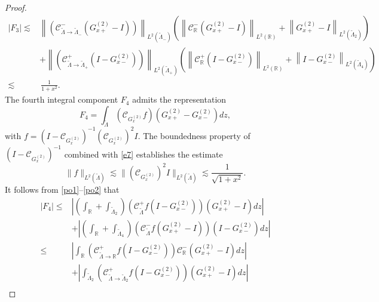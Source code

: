 \documentclass[preprint,compress,12pt]{elsarticle}
\numberwithin{equation}{section}
\begin{document}
\begin{proof}
\begin{align*}
\left|F_{3}\right|\lesssim&\left\|\left(\mathcal{C}_{\widetilde{\Lambda}\rightarrow\widetilde{\Lambda}_{-}}^{-}\left(G^{(2)}_{x+}-I\right)\right)\right\|_{L^{2}(\widetilde{\Lambda}_{-})}\left(\left\|\mathcal{C}_{\mathbb{R}}^{-}\left(G^{(2)}_{x+}-I\right)\right\|_{L^{2}(\mathbb{R})}+\left\|G^{(2)}_{x+}-I\right\|_{L^{2}(\widetilde{\Lambda}_{2})}\right)\\
&+\left\|\left(\mathcal{C}_{\widetilde{\Lambda}\rightarrow\widetilde{\Lambda}_{+}}^{+}\left(I-G^{(2)}_{x-}\right)\right)\right\|_{L^{2}(\widetilde{\Lambda}_{+})}\left(\left\|\mathcal{C}_{\mathbb{R}}^{+}\left(I-G^{(2)}_{x-}\right)\right\|_{L^{2}(\mathbb{R})}+\left\|I-G^{(2)}_{x-}\right\|_{L^{2}(\widetilde{\Lambda}_{4})}\right)\\
\lesssim&\,\frac{1}{1+x^{2}}.
\end{align*}
The fourth integral component $F_{4}$ admits the representation
\begin{equation*}
F_{4}=\int_{\widetilde{\Lambda}}\left(\mathcal{C}_{G^{(2)}_{x}}f\right)\left(G^{(2)}_{x+}-G^{(2)}_{x-}\right)dz,
\end{equation*}
with $f=(I-\mathcal{C}_{G^{(2)}_{x}})^{-1}(\mathcal{C}_{G^{(2)}_{x}})^{2}I$. The boundedness property of $(I-\mathcal{C}_{G^{(2)}_{x}})^{-1}$ combined with \eqref{e7} establishes the estimate
\begin{equation*}
\|f\|_{L^{2}(\widetilde{\Lambda})}\lesssim\|(\mathcal{C}_{G^{(2)}_{x}})^{2}I\|_{L^{2}(\widetilde{\Lambda})}\lesssim\frac{1}{\sqrt{1+x^{2}}}.
\end{equation*}
It follows from \eqref{po1}--\eqref{po2} that
\begin{equation*}
\begin{aligned}
\left|F_{4}\right|\leq&\left|\left(\int_{\mathbb{R}}+\int_{\widetilde{\Lambda}_{2}}\right)\left(\mathcal{C}_{\widetilde{\Lambda}}^{+}f\left(I-G^{(2)}_{x-}\right)\right)\left(G^{(2)}_{x+}-I\right)dz\right|\\
&+\left|\left(\int_{\mathbb{R}}+\int_{\widetilde{\Lambda}_{4}}\right)\left(\mathcal{C}_{\widetilde{\Lambda}}^{-}f\left(G^{(2)}_{x+}-I\right)\right)\left(I-G^{(2)}_{x-}\right)dz\right|\\
\leq&\left|\int_{\mathbb{R}}\left(\mathcal{C}_{\widetilde{\Lambda}\rightarrow\mathbb{R}}^{+}f\left(I-G^{(2)}_{x-}\right)\right)\mathcal{C}_{\mathbb{R}}^{-}\left(G^{(2)}_{x+}-I\right)dz\right|\\
&+\left|\int_{\widetilde{\Lambda}_{2}}\left(\mathcal{C}_{\widetilde{\Lambda}\rightarrow\widetilde{\Lambda}_{2}}^{+}f\left(I-G^{(2)}_{x-}\right)\right)\left(G^{(2)}_{x+}-I\right)dz\right|\\

\end{aligned}
\end{equation*}
\end{proof}
\end{document}
